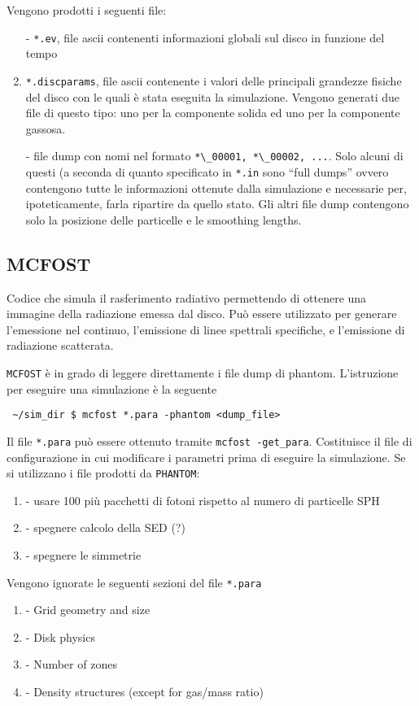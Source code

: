 \documentclass[DIN, pagenumber=false, fontsize=11pt, parskip=half]{scrartcl}
\begin{document}
Vengono prodotti i seguenti file:
\begin{enumerate}
 \item[-] \lstinline{*.ev}, file ascii contenenti informazioni globali sul disco in funzione del tempo 
 \item[-] \lstinline{*.discparams}, file ascii contenente i valori delle principali grandezze fisiche del disco con le quali è stata eseguita la simulazione. Vengono generati due file di questo tipo: uno per la componente solida ed uno per la componente gassosa.
 \item[-] file dump con nomi nel formato \lstinline{*\_00001, *\_00002, ...}. Solo alcuni di questi (a seconda di quanto specificato in \lstinline{*.in} sono ``full dumps'' ovvero contengono tutte le informazioni ottenute dalla simulazione e necessarie per, ipoteticamente, farla ripartire da quello stato. Gli altri file dump contengono solo la posizione delle particelle e le smoothing lengths.
\end{enumerate}

\subsection{MCFOST}
Codice che simula il rasferimento radiativo permettendo di ottenere una immagine della radiazione emessa dal disco.
Può essere utilizzato per generare l'emessione nel continuo, l'emissione di linee spettrali specifiche, e l'emissione di radiazione scatterata.

\lstinline{MCFOST} è in grado di leggere direttamente i file dump di phantom. L'istruzione per eseguire una simulazione è la seguente

\begin{lstlisting}
 ~/sim_dir $ mcfost *.para -phantom <dump_file>
\end{lstlisting}

Il file \lstinline{*.para} può essere ottenuto tramite \lstinline{mcfost -get_para}. Costituisce il file di configurazione in cui modificare i parametri prima di eseguire la simulazione. Se si utilizzano i file prodotti da \lstinline{PHANTOM}:
\begin{enumerate}
 \item[-] usare 100 più pacchetti di fotoni rispetto al numero di particelle SPH 
 \item[-] spegnere calcolo della SED (?)
 \item[-] spegnere le simmetrie
\end{enumerate}
Vengono ignorate le seguenti sezioni del file \lstinline{*.para}
\begin{enumerate}
 \item[-] Grid geometry and size
 \item[-] Disk physics
 \item[-] Number of zones
 \item[-] Density structures (except for gas/mass ratio)
\end{enumerate}
\end{document}

